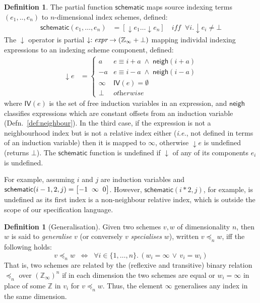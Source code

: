 \documentclass[9pt]{sigplanconf}
\newcounter{block}
\theoremstyle{definition}
\newtheorem{definition}[block]{Definition}
\newcommand{\ie}{\emph{i.e.}}
\newcommand{\neigh}{\textsf{neigh}}
\newcommand{\vthreeh}[3]{\setlength{\arraycolsep}{0em}
\left[\begin{array}{ccc}#1 \; & \; #2 \; & \; #3\end{array}\right]}
\begin{document}
\begin{definition}%
\label{def:schematic}
The partial function $\textsf{schematic}$ maps
source indexing terms $(e_1, .., e_n)$
to $n$-dimensional index schemes, defined:
%
\begin{align*}
\mathsf{schematic}(e_1, \ldots, e_n) & =
[\downarrow\!e_1 \ldots \downarrow\!e_n ]
\quad \textit{iff} \;\; \forall i . \downarrow\!e_i \neq \bot
\end{align*}
%
The $\downarrow$ operator is partial
 $\downarrow : \textit{expr} \rightarrow (\mathbb{Z}_\infty + \bot)$
mapping individal indexing expressions to 
an indexing scheme component, defined:
\begin{align*}
\downarrow\!e
 & =  \begin{cases}
a & e \equiv i + a \; \wedge \; \mathsf{neigh}(i + a) \\
-a & e \equiv i - a \; \wedge \; \mathsf{neigh}(i - a) \\
\infty & \textit{$\mathsf{IV}(e) = \emptyset$} \\
\bot   & \textit{otherwise}
\end{cases}
\end{align*}
where $\mathsf{IV}(e)$ is the set of free induction variables
in an expression, and $\neigh{}$ classifies expressions which
are constant offsets from an induction variable
(Defn.~\ref{def:neighbour}). In the third case,
if the expression is not a neighbourhood index but is not
a relative index either (\ie{}, not defined in terms
of an induction variable) then it is mapped to $\infty$, otherwise
$\downarrow\!e$ is undefined (returns $\bot$). The $\mathsf{schematic}$ function
is undefined if $\downarrow$ of any of its components $e_i$ is
undefined.

For example, assuming $i$ and $j$ are induction variables and $\textsf{schematic}(i-1, 2, j)
 = \vthreeh{-1}{\infty}{0}$. However, $\textsf{schematic}(i*2, j)$, for
 example, is
 undefined as its first index is a non-neighbour relative index, which
 is outside the scope of our specification language.
\end{definition}

\begin{definition}[Generalisation]
Given two schemes $v, w$ of dimensionality $n$,
then $w$ is said to \emph{generalise} $v$
(or conversely $v$ \emph{specialises} $w$),
written $v \preceq_n w$, iff the following holds:
\[
v \preceq_n w \;\; \Leftrightarrow  \;\;
  \forall i\!\in\!\{ 1, \ldots, n \} . \, (w_i = \infty \, \vee \, v_i = w_i)
\]
That is, two schemes are related by the (reflexive and transitive) binary relation
$\preceq_n$ over $(\mathbb{Z}_{\infty})^n$ if in each dimension
the two schemes are equal or $w_i = \infty$
in place of some $\mathbb{Z}$ in $v_i$ for $v \preceq_n w$.
Thus, the element $\infty$ generalises any index in the same dimension.
%
\end{definition}
\end{document}
